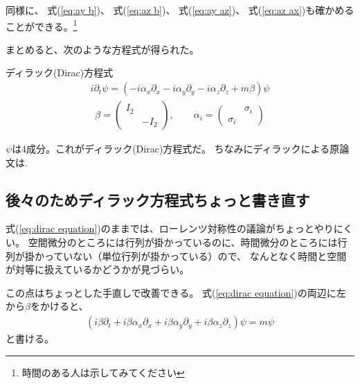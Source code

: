 \documentclass[10pt,a4paper]{jarticle}
\begin{document}
同様に、
式(\ref{eq:ay b})、
式(\ref{eq:az b})、
式(\ref{eq:ay az})、
式(\ref{eq:az ax})も確かめることができる。\footnote{時間のある人は示してみてください}

まとめると、次のような方程式が得られた。
\begin{itembox}[l]{ディラック(Dirac)方程式}
\begin{align}
i \partial_t \psi = (-i\alpha_x \partial_x-i\alpha_y \partial_y-i\alpha_z \partial_z + m \beta)\psi \label{eq:dirac equation}
\end{align}
%
\begin{align}
\beta = \left(\begin{array}{cc}
I_2 & \\
& -I_2
\end{array}\right), \qquad
\alpha_i = \left(\begin{array}{cc}
& \sigma_i \\
\sigma_i & 
\end{array}\right) \label{eq:alpha beta matrix}
\end{align}
\end{itembox}
$\psi$は4成分。これがディラック(Dirac)方程式だ。
ちなみにディラックによる原論文は\cite{Dirac:1928hu}.


\subsection{後々のためディラック方程式ちょっと書き直す}
式(\ref{eq:dirac equation})のままでは、ローレンツ対称性の議論がちょっとやりにくい。
空間微分のところには行列が掛かっているのに、時間微分のところには行列が掛かっていない（単位行列が掛かっている）ので、
なんとなく時間と空間が対等に扱えているかどうかが見づらい。

この点はちょっとした手直しで改善できる。
式(\ref{eq:dirac equation})の両辺に左から$\beta$をかけると、
\begin{align}
(i\beta\partial_t + i \beta\alpha_x \partial_x + i \beta\alpha_y \partial_y + i \beta\alpha_z \partial_z) \psi = m \psi
\end{align}
と書ける。
\end{document}
